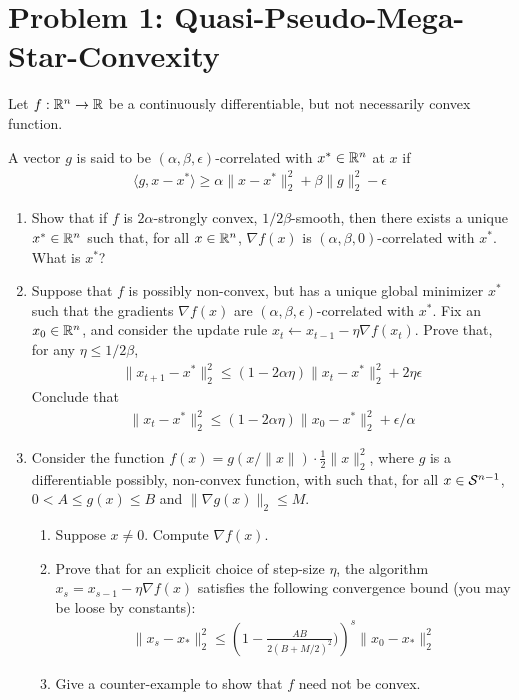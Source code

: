 \documentclass[12pt]{article}
\begin{document}
\section*{Problem 1: Quasi-Pseudo-Mega-Star-Convexity}
	Let $f: \mathbb{R}^n \to \mathbb{R}$ be a continuously differentiable, but not necessarily convex function. 
	\begin{definition}[Correlation] A vector $g$ is said to be $(\alpha,\beta,\epsilon)$-correlated with $x^* \in \mathbb{R}^n$ at $x$ if
	\begin{eqnarray}
	\langle g, x - x^* \rangle \ge \alpha \|x-x^*\|_2^2 + \beta \|g\|_2^2 - \epsilon
	\end{eqnarray}
	\end{definition}
	\begin{enumerate}
		\item Show that if $f$ is $2\alpha$-strongly convex, $1/2\beta$-smooth, then there exists a unique $x^* \in \mathbb{R}^n$ such that, for all $x \in \mathbb{R}^n$, $\nabla f(x)$ is $(\alpha,\beta,0)$-correlated with $x^*$. What is $x^*$?
		\item Suppose that $f$ is possibly non-convex, but has a unique global minimizer $x^*$ such that the gradients $\nabla f(x)$ are $(\alpha,\beta,\epsilon)$-correlated with $x^*$. Fix an $x_0 \in \mathbb{R}^n$, and consider the update rule $x_t \leftarrow x_{t-1} - \eta \nabla f(x_t)$. Prove that, for any $\eta \le 1/2\beta$,
		\begin{eqnarray}
		\|x_{t+1} - x^*\|_2^2 \le (1-2\alpha \eta)\|x_{t} - x^*\|_2^2 + 2\eta \epsilon
		\end{eqnarray}
		Conclude that 
		\begin{eqnarray}
		\|x_{t} - x^*\|_2^2 \le (1-2\alpha \eta)\|x_{0} - x^*\|_2^2 + \epsilon/\alpha
		\end{eqnarray}
		\item Consider the function $f(x) = g(x/\|x\|) \cdot \frac{1}{2}\|x\|_2^2$, where $g$ is a differentiable possibly, non-convex function, with such that, for all $x \in {\cal S}^{n-1}$, $0 < A \le g(x) \le B$ and $\|\nabla g(x)\|_2 \le M$. 
		\begin{enumerate}
			\item Suppose $x \ne 0$. Compute $\nabla f(x)$. 
			\item Prove that for an explicit choice of step-size $\eta$, the algorithm $x_{s} = x_{s-1} - \eta \nabla f(x)$ satisfies the following convergence bound (you may be loose by constants):
			\begin{eqnarray}
			\|x_s - x_*\|_2^2 \le \left(1 - \frac{AB}{2(B+M/2)^2})\right)^s \|x_0 - x_*\|_2^2
			\end{eqnarray}
			\item Give a counter-example to show that $f$ need not be convex.
		\end{enumerate} 

	\end{enumerate}
\end{document}
